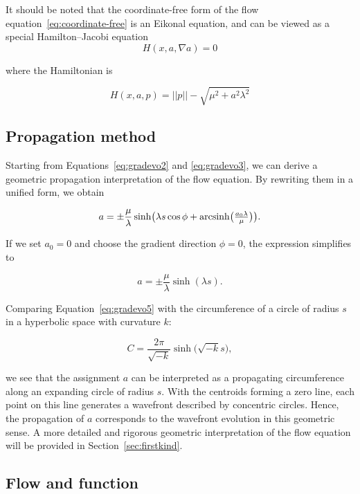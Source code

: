 It should be noted that the coordinate-free form of the flow equation~\eqref{eq:coordinate-free} is an Eikonal equation,
and can be viewed as a special Hamilton–Jacobi equation
\[
H(x, a, \nabla a) = 0
\]

where the Hamiltonian is

\begin{equation}\label{eq:hamiltonian}
    H(x, a, p) = ||p|| - \sqrt{\mu^2 + a^2 \lambda^2}
\end{equation}

\subsection{Propagation method}\label{subsec:propagation-method}

Starting from Equations~\eqref{eq:gradevo2} and \eqref{eq:gradevo3}, we can derive a geometric propagation interpretation of the flow equation.
By rewriting them in a unified form, we obtain

\begin{equation}
a = \pm \frac{\mu}{\lambda} \sinh\bigl(\lambda s \cos \phi + \operatorname{arcsinh}\bigl(\tfrac{a_0 \lambda}{\mu}\bigr)\bigr).\label{eq:gradevo4}
\end{equation}

If we set $a_0=0$ and choose the gradient direction $\phi=0$, the expression simplifies to

\begin{equation}
a = \pm \frac{\mu}{\lambda} \sinh(\lambda s).\label{eq:gradevo5}
\end{equation}

Comparing Equation~\eqref{eq:gradevo5} with the circumference of a circle of radius $s$ in a hyperbolic space with curvature $k$:

\begin{equation}
C =  \frac{2\pi}{\sqrt{-k}} \sinh\bigl(\sqrt{-k} s\bigr), \label{eq:circle}
\end{equation}

we see that the assignment $a$ can be interpreted as a propagating circumference along an expanding circle of radius $s$.
With the centroids forming a zero line, each point on this line generates a wavefront described by concentric circles.
Hence, the propagation of $a$ corresponds to the wavefront evolution in this geometric sense.
A more detailed and rigorous geometric interpretation of the flow equation will be provided in Section~\ref{sec:firstkind}.

\subsection{Flow and function}\label{subsec:flow-and-function}

